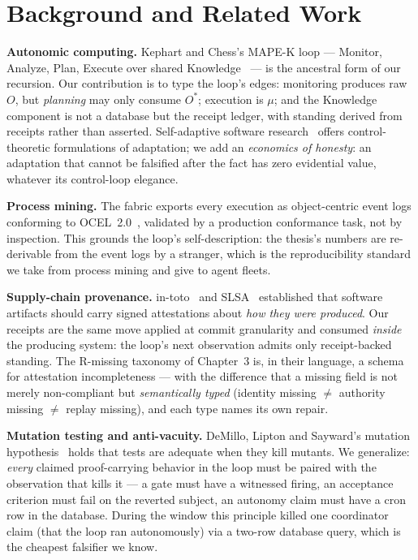 \documentclass[11pt,a4paper]{article}
\theoremstyle{remark}
\newcommand{\Ostar}{$O^{*}$}
\begin{document}
\section{Background and Related Work}

\textbf{Autonomic computing.} Kephart and Chess's MAPE-K loop --- Monitor, Analyze, Plan, Execute over shared Knowledge~\cite{kephart2003} --- is the ancestral form of our recursion. Our contribution is to type the loop's edges: monitoring produces raw $O$, but \emph{planning} may only consume \Ostar{}; execution is $\mu$; and the Knowledge component is not a database but the receipt ledger, with standing derived from receipts rather than asserted. Self-adaptive software research~\cite{salehie2009,weyns2020} offers control-theoretic formulations of adaptation; we add an \emph{economics of honesty}: an adaptation that cannot be falsified after the fact has zero evidential value, whatever its control-loop elegance.

\textbf{Process mining.} The fabric exports every execution as object-centric event logs conforming to OCEL~2.0~\cite{ocel2}, validated by a production conformance task, not by inspection. This grounds the loop's self-description: the thesis's numbers are re-derivable from the event logs by a stranger, which is the reproducibility standard we take from process mining and give to agent fleets.

\textbf{Supply-chain provenance.} in-toto~\cite{intoto} and SLSA~\cite{slsa} established that software artifacts should carry signed attestations about \emph{how they were produced}. Our receipts are the same move applied at commit granularity and consumed \emph{inside} the producing system: the loop's next observation admits only receipt-backed standing. The R-missing taxonomy of Chapter~3 is, in their language, a schema for attestation incompleteness --- with the difference that a missing field is not merely non-compliant but \emph{semantically typed} (identity missing $\neq$ authority missing $\neq$ replay missing), and each type names its own repair.

\textbf{Mutation testing and anti-vacuity.} DeMillo, Lipton and Sayward's mutation hypothesis~\cite{demillo1978} holds that tests are adequate when they kill mutants. We generalize: \emph{every} claimed proof-carrying behavior in the loop must be paired with the observation that kills it --- a gate must have a witnessed firing, an acceptance criterion must fail on the reverted subject, an autonomy claim must have a cron row in the database. During the window this principle killed one coordinator claim (that the loop ran autonomously) via a two-row database query, which is the cheapest falsifier we know.
\end{document}
